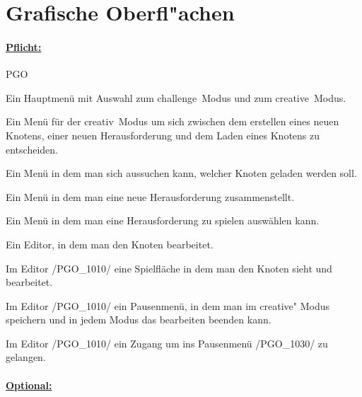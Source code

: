 %
%


%
%
\clearpage


\section{Grafische Oberfl{"a}chen}
\label{NU:GO}

\paragraph*{\underline{Pflicht:}}

\begin{ids}{\gls{PGO}}

	\id[0010] Ein Hauptmenü mit Auswahl zum \glqq challenge\grqq~Modus und zum \glqq creative\grqq~Modus.
	
	\id[0020] Ein Menü für der \glqq creativ\grqq~Modus um sich zwischen dem erstellen eines neuen Knotens, einer neuen Herausforderung und dem Laden eines Knotens zu entscheiden.
	
	\id[0030] Ein Menü in dem man sich aussuchen kann, welcher Knoten geladen werden soll.
	
	\id[0040] Ein Menü in dem man eine neue Herausforderung zusammenstellt.
	
	\id[0050] Ein Menü in dem man eine Herausforderung zu spielen auswählen kann.
	
	\id[1010] Ein Editor, in dem man den Knoten bearbeitet.
	
	\id[1020] Im Editor /PGO\_1010/ eine Spielfläche in dem man den Knoten sieht und bearbeitet.
	
	\id[1030] Im Editor /PGO\_1010/ ein Pausenmenü, in dem man im \glqq creative" Modus speichern und in jedem Modus das bearbeiten beenden kann.
	
	\id[1040] Im Editor /PGO\_1010/ ein Zugang um ins Pausenmenü /PGO\_1030/ zu gelangen.

\end{ids}




\paragraph*{\underline{Optional:}}

